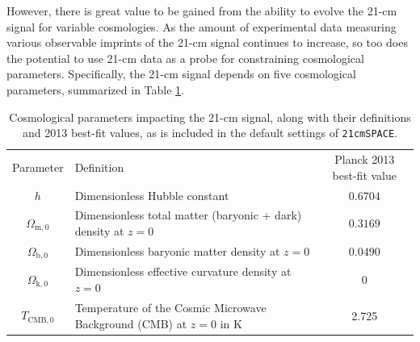 \documentclass[floats,floatfix,showpacs,amssymb,prd,superscriptaddress,nofootinbib, 11pt]{revtex4-2} %
\newcommand{\code}{\texttt}
\begin{document}
However, there is great value to be gained from the ability to evolve the 21-cm signal for variable cosmologies. As the amount of experimental data measuring various observable imprints of the 21-cm signal continues to increase, so too does the potential to use 21-cm data as a probe for constraining cosmological parameters. Specifically, the 21-cm signal depends on five cosmological parameters, summarized in Table \ref{tab:cosmological_parameters}.


\begin{table}[H]
    \centering
    \begin{tabular}{c l c}
        \hline
        Parameter & Definition & Planck 2013 best-fit value\\ \hhline{===}
        $h$ & Dimensionless Hubble constant & $0.6704$\\
        $\Omega_{\text{m}, 0}$ & Dimensionless total matter (baryonic + dark) density at $z = 0$ & $0.3169$\\
        $\Omega_{\text{b}, 0}$ & Dimensionless baryonic matter density at $z = 0$ & $0.0490$\\
        $\Omega_{\text{k}, 0}$ & Dimensionless effective curvature density at $z = 0$ & $0$\\
        $T_{\text{CMB},0}$ & Temperature of the Cosmic Microwave Background (CMB) at $z = 0$ in K & 2.725\\ \hline
    \end{tabular}
    \caption{Cosmological parameters impacting the 21-cm signal, along with their definitions and 2013 best-fit values, as is included in the default settings of \code{21cmSPACE}.}
    \label{tab:cosmological_parameters}
\end{table}


\end{document}
